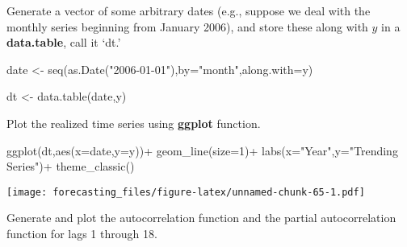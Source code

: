 \documentclass[
  oneside]{book}
\newenvironment{Shaded}{\begin{snugshade}}{\end{snugshade}}
\newcommand{\AttributeTok}[1]{\textcolor[rgb]{0.77,0.63,0.00}{#1}}
\newcommand{\DecValTok}[1]{\textcolor[rgb]{0.00,0.00,0.81}{#1}}
\newcommand{\FunctionTok}[1]{\textcolor[rgb]{0.00,0.00,0.00}{#1}}
\newcommand{\NormalTok}[1]{#1}
\newcommand{\OtherTok}[1]{\textcolor[rgb]{0.56,0.35,0.01}{#1}}
\newcommand{\SpecialCharTok}[1]{\textcolor[rgb]{0.00,0.00,0.00}{#1}}
\newcommand{\StringTok}[1]{\textcolor[rgb]{0.31,0.60,0.02}{#1}}
\begin{document}
Generate a vector of some arbitrary dates (e.g., suppose we deal with the monthly series beginning from January 2006), and store these along with \(y\) in a \textbf{data.table}, call it `dt.'

\begin{Shaded}
\begin{Highlighting}[]
\NormalTok{date }\OtherTok{\textless{}{-}} \FunctionTok{seq}\NormalTok{(}\FunctionTok{as.Date}\NormalTok{(}\StringTok{"2006{-}01{-}01"}\NormalTok{),}\AttributeTok{by=}\StringTok{"month"}\NormalTok{,}\AttributeTok{along.with=}\NormalTok{y)}

\NormalTok{dt }\OtherTok{\textless{}{-}} \FunctionTok{data.table}\NormalTok{(date,y)}
\end{Highlighting}
\end{Shaded}

Plot the realized time series using \textbf{ggplot} function.

\begin{Shaded}
\begin{Highlighting}[]
\FunctionTok{ggplot}\NormalTok{(dt,}\FunctionTok{aes}\NormalTok{(}\AttributeTok{x=}\NormalTok{date,}\AttributeTok{y=}\NormalTok{y))}\SpecialCharTok{+}
  \FunctionTok{geom\_line}\NormalTok{(}\AttributeTok{size=}\DecValTok{1}\NormalTok{)}\SpecialCharTok{+}
  \FunctionTok{labs}\NormalTok{(}\AttributeTok{x=}\StringTok{"Year"}\NormalTok{,}\AttributeTok{y=}\StringTok{"Trending Series"}\NormalTok{)}\SpecialCharTok{+}
  \FunctionTok{theme\_classic}\NormalTok{()}
\end{Highlighting}
\end{Shaded}

\texttt{[image: forecasting\_files/figure-latex/unnamed-chunk-65-1.pdf]}

Generate and plot the autocorrelation function and the partial autocorrelation function for lags 1 through 18.
\end{document}
